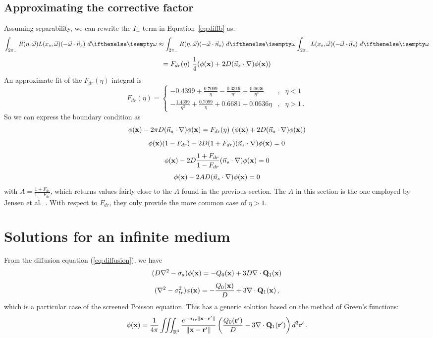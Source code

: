 \documentclass[10pt,a4paper]{article}
\begin{document}
\subsection{Approximating the corrective factor}
\label{sec:approxc}
Assuming separability, we can rewrite the $I_-$ term in Equation~\ref{eq:diffb} as:
$$
 \lowerhemisphere{R(\eta, \omegavec) L(x_s, \omegavec) (-\omegavec \cdot \vec{n}_s)}{} \approx \lowerhemisphere{R(\eta, \omegavec)  (-\omegavec \cdot \vec{n}_s)}{} \lowerhemisphere{L(x_s, \omegavec) (-\omegavec \cdot \vec{n}_s)}{}
$$
$$
= F_{dr}(\eta)\  \frac{1}{4}({\phi}(\mathbf{x}) + 2 D (\vec{n}_s \cdot {\nabla}) {\phi}(\mathbf{x}))
$$
An approximate fit of the $F_{dr}(\eta)$ integral is~\cite{egan73}
$$
F_{dr}(\eta) = \left\{\begin{array}{ccl} \displaystyle -0.4399 + \frac{0.7099}{\eta} - \frac{0.3319}{\eta^2} + \frac{0.0636}{\eta^3} & , & \eta < 1 \\[2ex]
\displaystyle -\frac{1.4399}{\eta^2} +\frac{0.7099}{\eta} + 0.6681 + 0.0636 \eta & , & \eta > 1 \, .\end{array}\right.
$$
So we can express the boundary condition as
$$
{\phi}(\mathbf{x}) - 2 \pi D (\vec{n}_s \cdot {\nabla}) {\phi}(\mathbf{x}) = F_{dr}(\eta)\ ({\phi}(\mathbf{x}) + 2 D (\vec{n}_s \cdot {\nabla}) {\phi}(\mathbf{x}))
$$
$$
{\phi}(\mathbf{x}) (1 - F_{dr}) - 2 D (1 + F_{dr}) (\vec{n}_s \cdot {\nabla}) {\phi}(\mathbf{x}) = 0
$$
$$
{\phi}(\mathbf{x}) - 2 D \frac{1 + F_{dr}}{1 - F_{dr}} (\vec{n}_s \cdot {\nabla}) {\phi}(\mathbf{x}) = 0
$$
$$
{\phi}(\mathbf{x}) - 2 A D (\vec{n}_s \cdot {\nabla}) {\phi}(\mathbf{x}) = 0
$$
with $A = \frac{1 + F_{dr}}{1 - F_{dr}}$, which returns values fairly close to the $A$ found in the previous section. The $A$ in this section is the one employed by Jensen et al.~\cite{jensen01}. With respect to $F_{dr}$, they only provide the more common case of $\eta > 1$.

\section{Solutions for an infinite medium}
From the diffusion equation (\ref{eq:diffusion}), we have
$$
(D \nabla^2 - \sigma_a) {\phi}(\mathbf{x}) =  -{Q_0}(\mathbf{x}) + 3 D {\nabla} \cdot \mathbf{Q}_1(\mathbf{x})
$$
$$
(\nabla^2 - \sigma_{tr}^2) {\phi}(\mathbf{x}) =  -  \frac{{Q_0}(\mathbf{x})}{D} + 3 {\nabla} \cdot \mathbf{Q}_1(\mathbf{x}) \, ,
$$
which is a particular case of the screened Poisson equation. This has a generic solution based on the method of Green's functions:
$$
{\phi}(\mathbf{x}) = \frac{1}{4 \pi} \iiint_{\mathbb{R}^3} \frac{e^{-\sigma_{tr} \|\mathbf{x} - \mathbf{r}' \|}}{\|\mathbf{x} - \mathbf{r}' \|} \left(  \frac{{Q_0}(\mathbf{r'})}{D} - 3 {\nabla} \cdot \mathbf{Q}_1(\mathbf{r'})\right) d^3 \mathbf{r}' \, .
\label{eq:poisson}
$$
\end{document}
